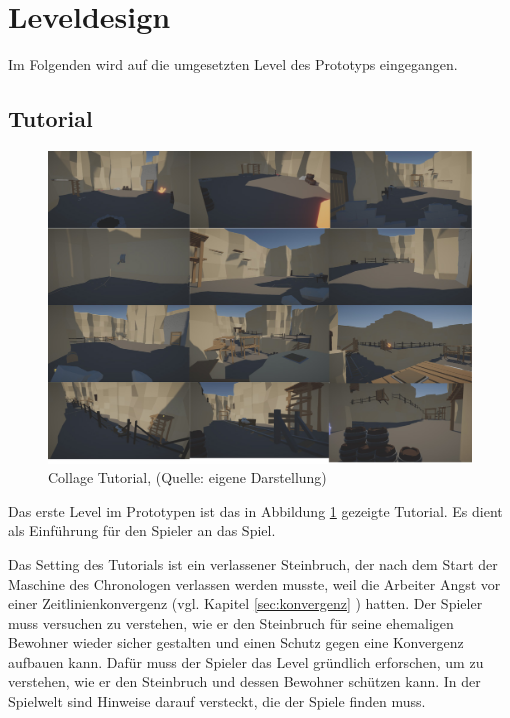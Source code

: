 \section{Leveldesign}

Im Folgenden wird auf die umgesetzten Level des Prototyps eingegangen.

\subsection{Tutorial}

\begin{figure}[ht]
\centering
\includegraphics[width=1\linewidth]{content/pictures/Tutorial - A Fraction of Time.jpg}
\caption{Collage Tutorial, (Quelle: eigene Darstellung)}
\label{fig:collage_tutorial}
\end{figure}

Das erste Level im Prototypen ist das in Abbildung \ref{fig:collage_tutorial}  gezeigte Tutorial. Es dient als Einführung für den Spieler an das Spiel. 

Das Setting des Tutorials ist ein verlassener Steinbruch, der nach dem Start der Maschine des Chronologen verlassen werden musste, weil die Arbeiter Angst vor einer Zeitlinienkonvergenz (vgl. Kapitel \ref{sec:konvergenz} ) hatten. Der Spieler muss versuchen zu verstehen, wie er den Steinbruch für seine ehemaligen Bewohner wieder sicher gestalten und einen Schutz gegen eine Konvergenz aufbauen kann.
Dafür muss der Spieler das Level gründlich erforschen, um zu verstehen, wie er den Steinbruch und dessen Bewohner schützen kann. In der Spielwelt sind Hinweise darauf versteckt, die der Spiele finden muss.

